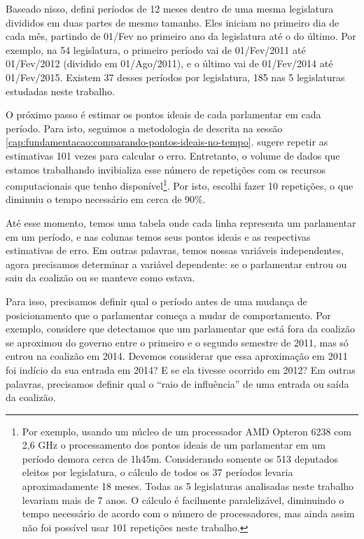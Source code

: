 \documentclass[a4paper,titlepage]{ppgi}\usepackage[]{graphicx}\usepackage[]{color}
\begin{document}
Baseado nisso, defini períodos de 12 meses dentro de uma mesma legislatura
divididos em duas partes de mesmo tamanho. Eles iniciam no primeiro dia de cada
mês, partindo de 01/Fev no primeiro ano da legislatura até o do último. Por
exemplo, na 54\textordfeminine{} legislatura, o primeiro período vai de
01/Fev/2011 até 01/Fev/2012 (dividido em 01/Ago/2011), e o último vai de
01/Fev/2014 até 01/Fev/2015. Existem 37 desses períodos por legislatura, 185
nas 5 legislaturas estudadas neste trabalho.

O próximo passo é estimar os pontos ideais de cada parlamentar em cada período.
Para isto, seguimos a metodologia de  descrita na sessão
\ref{cap:fundamentacao:comparando-pontos-ideais-no-tempo}.
\citeauthor{Poole2005} sugere repetir as estimativas 101 vezes para calcular o
erro. Entretanto, o volume de dados que estamos trabalhando invibializa esse
número de repetições com os recursos computacionais que tenho
disponível\footnote{Por exemplo, usando um núcleo de um processador AMD
Opteron\texttrademark{} 6238 com 2,6 GHz o processamento dos pontos ideais de
um parlamentar em um período demora cerca de 1h45m. Considerando somente os 513
deputados eleitos por legislatura, o cálculo de todos os 37 períodos levaria
aproximadamente 18 meses. Todas as 5 legislaturas analisadas neste trabalho
levariam mais de 7 anos. O cálculo é facilmente paralelizável, diminuindo o
tempo necessário de acordo com o número de processadores, mas ainda assim não
foi possível usar 101 repetições neste trabalho.}. Por isto, escolhi fazer 10
repetições, o que diminuiu o tempo necessário em cerca de 90\%.

Até esse momento, temos uma tabela onde cada linha representa um parlamentar em
um período, e nas colunas temos seus pontos ideais e as respectivas estimativas
de erro. Em outras palavras, temos nossas variáveis independentes, agora
precisamos determinar a variável dependente: se o parlamentar entrou ou saiu da
coalizão ou se manteve como estava.

Para isso, precisamos definir qual o período antes de uma mudança de
posicionamento que o parlamentar começa a mudar de comportamento. Por exemplo,
considere que detectamos que um parlamentar que está fora da coalizão se
aproximou do governo entre o primeiro e o segundo semestre de 2011, mas só
entrou na coalizão em 2014. Devemos considerar que essa aproximação em 2011 foi
indício da sua entrada em 2014? E se ela tivesse ocorrido em 2012?  Em outras
palavras, precisamos definir qual o ``raio de influência'' de uma entrada ou
saída da coalizão.
\end{document}
